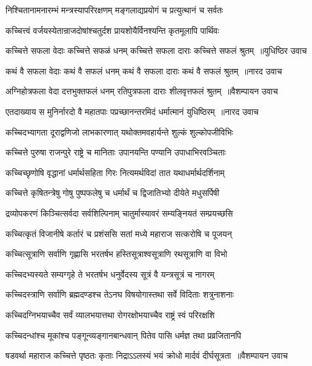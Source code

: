 \twolineshloka
{निश्चितानामनारम्भं मन्त्रस्यापरिरक्षणम्}
{मङ्गलाद्यप्रयोगं च प्रत्युत्थानं च सर्वतः}


\twolineshloka
{कच्चित्त्वं वर्जयस्येतान्राजदोषांश्चतुर्दश}
{प्रायशोयैर्विनश्यन्ति कृतमूलापि पार्थिवः}


\threelineshloka
{कच्चित्ते सफला वेदाः कच्चित्ते सफळं धनम्}
{कच्चित्ते सफला दाराः कच्चित्ते सफलं श्रुतम् ॥युधिष्ठिर उवाच}
{}


\threelineshloka
{कथं वै सफला वेदाः कथं वै सफलं धनम्}
{कथं वै सफला दाराः कथं वै सफलं श्रुतम् ॥नारद उवाच}
{}


\threelineshloka
{अग्निहोत्रफला वेदा दत्तभुक्तफलं धनम्}
{रतिपुत्रफला दाराः शीलवृत्तफलं श्रुतम् ॥वैशम्पायन उवाच}
{}


\threelineshloka
{एतदाख्याय स मुनिर्नारदो वै महातपाः}
{पप्रच्छानन्तरमिदं धर्मात्मानं युधिष्ठिरम् ॥नारद उवाच}
{}


\twolineshloka
{कच्चिदभ्यागता दूराद्वणिजो लाभकारणात्}
{यथोक्तमवहार्यन्ते शुल्कं शुल्कोपजीविभिः}


\twolineshloka
{कच्चित्ते पुरुषा राजन्पुरे राष्ट्रे च मानिताः}
{उपानयन्ति पण्यानि उपाधाभिरवञ्चिताः}


\twolineshloka
{कच्चिच्छृणोषि वृद्धानां धर्मार्थसहिता गिरः}
{नित्यमर्थविदां तात यथाधर्मार्थदर्शिनाम्}


\twolineshloka
{कच्चित्ते कृषितन्त्रेषु गोषु पुष्पफलेषु च}
{धर्मार्थं च द्विजातिभ्यो दीयेते मधुसर्पिषी}


\twolineshloka
{द्रव्योपकरणं किञ्चित्सर्वदा सर्वशिल्पिनाम्}
{चातुर्मास्यावरं सम्यङ्नियतं सम्प्रयच्छसि}


\twolineshloka
{कच्चित्कृतं विजानीषे कर्तारं च प्रशंससि}
{सतां मध्ये महाराज सत्करोषि च पूजयन्}


\twolineshloka
{कच्चित्सूत्राणि सर्वाणि गृह्णासि भरतर्षभ}
{हस्तिसूत्राश्वसूत्राणि रथसूत्राणि वा विभो}


\twolineshloka
{कच्चिदभ्यस्यते सम्यग्गृहे ते भरतर्षभ}
{धनुर्वेदस्य सूत्रं वै यन्त्रसूत्रं च नागरम्}


\twolineshloka
{कच्चिदस्त्राणि सर्वाणि ब्रह्मदण्डश्च तेऽनघ}
{विषयोगास्तथा सर्वे विदिताः शत्रुनाशनाः}


\twolineshloka
{कच्चिदग्निभयाच्चैव सर्वं व्यालभयात्तथा}
{रोगरक्षोभयाच्चैव राष्ट्रं स्वं परिरक्षशि}


\twolineshloka
{कच्चिदन्धांश्च मूकांश्च पङ्गून्व्यङ्गानबान्धवान्}
{पितेव पासि धर्मज्ञ तथा प्रव्रजितानपि}


\threelineshloka
{षडवर्था महाराज कच्चित्ते पृष्ठतः कृताः}
{निद्राऽऽलस्यं भयं क्रोधो मार्दवं दीर्घसूत्रता ॥वैशम्पायन उवाच}
{}


